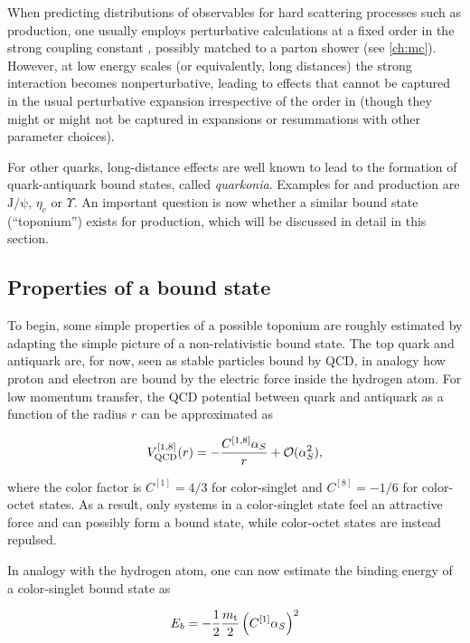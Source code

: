 When predicting distributions of observables for hard scattering processes such as \ttbar production, one usually employs perturbative calculations at a fixed order in the strong coupling constant \alphas, possibly matched to a parton shower (see \cref{ch:mc}). However, at low energy scales (or equivalently, long distances) the strong interaction becomes nonperturbative, leading to effects that cannot be captured in the usual perturbative expansion irrespective of the order in \alphas (though they might or might not be captured in expansions or resummations with other parameter choices).

For other quarks, long-distance effects are well known to lead to the formation of quark-antiquark bound states, called \textit{quarkonia}. Examples for \ccbar and \bbbar production are $\mathrm{J/\psi}$, $\eta_c$ or $\Upsilon$. An important question is now whether a similar bound state (``toponium'') exists for \ttbar production, which will be discussed in detail in this section.

\subsection{Properties of a \ttbartitle bound state}

To begin, some simple properties of a possible toponium are roughly estimated by adapting the simple picture of a non-relativistic bound state. The top quark and antiquark are, for now, seen as stable particles bound by QCD, in analogy how proton and electron are bound by the electric force inside the hydrogen atom. For low momentum transfer, the QCD potential between quark and antiquark as a function of the radius $r$ can be approximated as

\begin{equation}
  V_{\mathrm{QCD}}^{[1,8]} (r) = - \frac{C^{[1,8]} \alpha_S}{r} + \mathcal{O}(\alpha_S^2) ,
\end{equation}

\noindent where the color factor is $C^{[1]} = 4/3$ for color-singlet and $C^{[8]} = -1/6$ for color-octet \ttbar states. As a result, only \ttbar systems in a color-singlet state feel an attractive force and can possibly form a bound state, while color-octet states are instead repulsed.

In analogy with the hydrogen atom, one can now estimate the binding energy of a color-singlet \ttbar bound state as

\begin{equation}
\label{eq:theory:toponium_eb}
  E_b = -\frac{1}{2} \frac{m_{\mathrm{t}}}{2} \left( C^{[1]} \alpha_S \right)^2
\end{equation}

